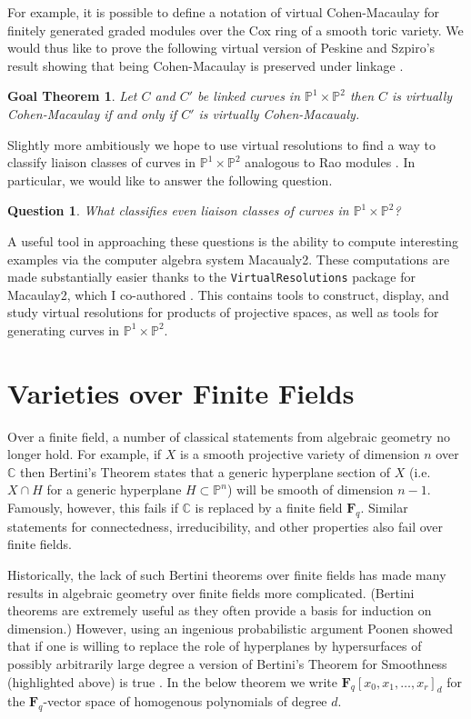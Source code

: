 \documentclass[10pt,reqno]{amsart}
\newtheorem{goalTheorem}[lemma]{Goal Theorem}
\newtheorem{question}[lemma]{Question}
\theoremstyle{remark}
\newcommand{\fF}{\mathbf F}
\newcommand{\C}{\mathbb{C}}
\renewcommand{\P}{\mathbb{P}}
\begin{document}
For example, it is possible to define a notation of virtual Cohen-Macaulay for finitely generated graded modules over the Cox ring of a smooth toric variety. We would thus like to prove the following virtual version of Peskine and Szpiro's result showing that being Cohen-Macaulay is preserved under linkage \cite{peskineSzpiro74}. 

\begin{goalTheorem}
Let $C$ and $C'$ be linked curves in $\P^1\times\P^2$ then $C$ is virtually Cohen-Macaulay if and only if $C'$ is virtually Cohen-Macaualy.
\end{goalTheorem}

Slightly more ambitiously we hope to use virtual resolutions to find a way to classify liaison classes of curves in $\P^1\times\P^2$ analogous to Rao modules \cite{rao78}. In particular, we would like to answer the following question. 
 
\begin{question}
What classifies even liaison classes of curves in $\P^1\times\P^2$?
\end{question}

A useful tool in approaching these questions is the ability to compute interesting examples via the computer algebra system Macaualy2. These computations are made substantially easier thanks to the  \texttt{VirtualResolutions} package for Macaulay2, which I co-authored \cite{almousaBruce19}. This contains tools to construct, display, and study virtual resolutions for products of projective spaces, as well as tools for generating curves in $\P^1\times\P^2$. 

\section{Varieties over Finite Fields}

Over a finite field, a number of classical statements from algebraic geometry no longer hold. For example, if $X$ is a smooth projective variety of dimension $n$ over $\C$ then Bertini's Theorem states that a generic hyperplane section of $X$ (i.e. $X\cap H$ for a generic hyperplane $H\subset \P^n$) will be smooth of dimension $n-1$. Famously, however, this fails if $\C$ is replaced by a finite field $\fF_{q}$. Similar statements for connectedness, irreducibility, and other properties also fail over finite fields. 

Historically, the lack of such Bertini theorems over finite fields has made many results in algebraic geometry over finite fields more complicated. (Bertini theorems are extremely useful as they often provide a basis for induction on dimension.) However, using an ingenious probabilistic argument Poonen showed that if one is willing to replace the role of hyperplanes by hypersurfaces of possibly arbitrarily large degree a version of Bertini's Theorem for Smoothness (highlighted above) is true \cite{poonen04}. In the below theorem we write $\fF_{q}[x_{0},x_{1},\ldots,x_{r}]_{d}$ for the $\fF_{q}$-vector space of homogenous polynomials of degree $d$. 
\end{document}
